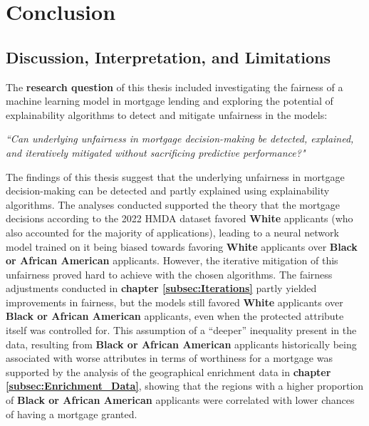 \chapter{Conclusion}\label{ch:discussion}

\section{Discussion, Interpretation, and Limitations}\label{sec:discussion}

The \textbf{research question} of this thesis included investigating the fairness of a machine learning model in mortgage lending and exploring the potential of explainability algorithms to detect and mitigate unfairness in the models:

\textit{“Can underlying unfairness in mortgage decision-making be detected, explained, and iteratively mitigated without sacrificing predictive performance?"}

The findings of this thesis suggest that the underlying unfairness in mortgage decision-making can be detected and partly explained using explainability algorithms. 
The analyses conducted supported the theory that the mortgage decisions according to the 2022 HMDA dataset favored \textbf{White} applicants (who also accounted for the majority of applications), leading to a neural network model trained on it being biased towards favoring \textbf{White} applicants over \textbf{Black or African American} applicants.
However, the iterative mitigation of this unfairness proved hard to achieve with the chosen algorithms. 
The fairness adjustments conducted in \textbf{chapter \ref{subsec:Iterations}} partly yielded improvements in fairness, but the models still favored \textbf{White} applicants over \textbf{Black or African American} applicants, even when the protected attribute itself was controlled for.
This assumption of a “deeper” inequality present in the data, resulting from \textbf{Black or African American} applicants historically being associated with worse attributes in terms of worthiness for a mortgage was supported by the analysis of the geographical enrichment data in \textbf{chapter \ref{subsec:Enrichment_Data}}, showing that the regions with a higher proportion of \textbf{Black or African American} applicants were correlated with lower chances of having a mortgage granted.



